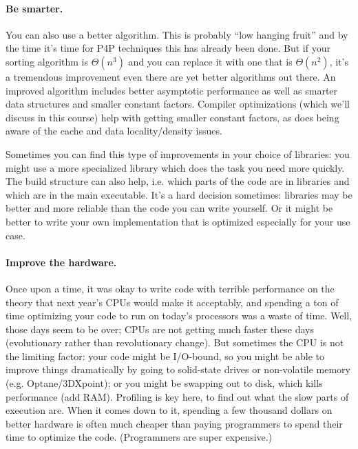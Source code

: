 \paragraph{Be smarter.} You can also use a better algorithm. This is probably ``low hanging fruit'' and by the time it's time for P4P techniques this has already been done. But if your sorting algorithm is $\Theta(n^{3})$ and you can replace it with one that is $\Theta(n^{2})$, it's a tremendous improvement even there are yet better algorithms out there. An improved algorithm includes better asymptotic performance
as well as smarter data structures and smaller constant factors.
Compiler optimizations (which we'll discuss in this course) help with
getting smaller constant factors, as does being aware of the cache
and data locality/density issues.

Sometimes you can find this type of improvements in your choice of
libraries: you might use a more specialized library which does the
task you need more quickly. The build structure can also help, i.e. which parts of the code are in libraries and which are in the main executable. It's a hard decision sometimes: libraries may be better and more reliable than the code you can write yourself. Or it might be better to write your own implementation that is optimized especially for your use case.

\paragraph{Improve the hardware.} Once upon a time, it was okay to write code with terrible performance on the theory that next year's CPUs would make it acceptably, and spending a ton of time optimizing your code to run on today's processors was a waste of time. Well, those days seem to be over; CPUs are not getting much faster these days (evolutionary rather than revolutionary change). But sometimes the CPU is not the limiting factor: your code might be I/O-bound, so you might be able
to improve things dramatically by going to solid-state drives or non-volatile memory (e.g. Optane/3DXpoint); or you might be swapping
out to disk, which kills performance (add RAM). Profiling is key here, to find out what the slow parts of execution are. When it comes down to it, spending a few thousand dollars on better hardware is often much cheaper than paying programmers to spend their time to optimize the code. (Programmers are super expensive.)

